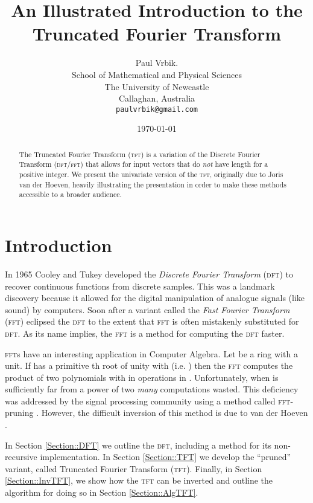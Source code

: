 \documentclass[12pt]{article}
\title{An Illustrated Introduction to the Truncated Fourier Transform}
\author{Paul Vrbik. \\
School of Mathematical and Physical Sciences \\
The University of Newcastle\\
Callaghan, Australia\\
\tt{paulvrbik@gmail.com}}
\date{\today}
\theoremstyle{definition}
\newcommand{\0}{\mathbf{0}}
\theoremstyle{theorem}
\theoremstyle{definition}
\begin{document}
\maketitle


\begin{abstract}
The Truncated Fourier Transform (\textsc{tft}) is a variation of the Discrete Fourier Transform (\textsc{dft}/\textsc{fft}) that allows for input vectors that do \emph{not} have length  for  a positive integer. We present the univariate version of the \textsc{tft}, originally due to Joris van der Hoeven, heavily illustrating the presentation in order to make these methods accessible to a broader audience.
\end{abstract}



\section{Introduction}


In 1965 Cooley and Tukey developed the \emph{Discrete Fourier Transform} (\textsc{dft}) to recover continuous functions from discrete samples. This was a landmark discovery because it allowed for the digital manipulation of analogue signals (like sound) by computers. Soon after a variant called the \emph{Fast Fourier Transform} (\textsc{fft}) eclipsed the \textsc{dft} to the extent that \textsc{fft} is often mistakenly substituted for \textsc{dft}. As its name implies, the \textsc{fft} is a method for computing the \textsc{dft} faster.






\textsc{fft}s have an interesting application in Computer Algebra. Let  be a ring with  a unit. If  has a primitive th root of unity  with  (i.e. ) then the \textsc{fft} computes the product of two polynomials  with  in  operations in . Unfortunately, when  is sufficiently far from a power of two \emph{many} computations wasted. This deficiency was addressed by the signal processing community using a method called \textsc{fft}-pruning \cite{SigProcessing}. However, the difficult inversion of this method is due to van der Hoeven \cite{TFT2}\cite{TFT1}.\smallskip

In Section \ref{Section::DFT} we outline the \textsc{dft}, including a method for its non-recursive implementation. In Section \ref{Section::TFT} we develop the ``pruned'' variant, called Truncated Fourier Transform (\textsc{tft}). Finally, in Section \ref{Section::InvTFT}, we show how the \textsc{tft} can be inverted and outline the algorithm for doing so in Section \ref{Section::AlgTFT}.
\end{document}

